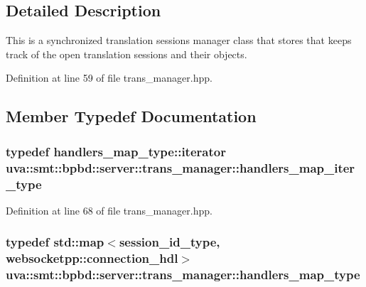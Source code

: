 \subsection{Detailed Description}
This is a synchronized translation sessions manager class that stores that keeps track of the open translation sessions and their objects. 

Definition at line 59 of file trans\+\_\+manager.\+hpp.



\subsection{Member Typedef Documentation}
\hypertarget{classuva_1_1smt_1_1bpbd_1_1server_1_1trans__manager_adec62cec51f0ade28dbf9311b3a3b4ad}{}
\subsubsection[{handlers\+\_\+map\+\_\+iter\+\_\+type}]{\setlength{\rightskip}{0pt plus 5cm}typedef handlers\+\_\+map\+\_\+type\+::iterator {\bf uva\+::smt\+::bpbd\+::server\+::trans\+\_\+manager\+::handlers\+\_\+map\+\_\+iter\+\_\+type}}\label{classuva_1_1smt_1_1bpbd_1_1server_1_1trans__manager_adec62cec51f0ade28dbf9311b3a3b4ad}


Definition at line 68 of file trans\+\_\+manager.\+hpp.

\hypertarget{classuva_1_1smt_1_1bpbd_1_1server_1_1trans__manager_ad5d869b7da9455a2903c5682dde5bcfe}{}
\subsubsection[{handlers\+\_\+map\+\_\+type}]{\setlength{\rightskip}{0pt plus 5cm}typedef std\+::map$<${\bf session\+\_\+id\+\_\+type}, {\bf websocketpp\+::connection\+\_\+hdl}$>$ {\bf uva\+::smt\+::bpbd\+::server\+::trans\+\_\+manager\+::handlers\+\_\+map\+\_\+type}}\label{classuva_1_1smt_1_1bpbd_1_1server_1_1trans__manager_ad5d869b7da9455a2903c5682dde5bcfe}


